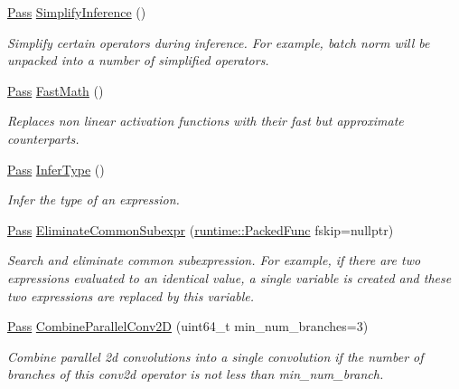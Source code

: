 \begin{DoxyCompactItemize}
\hyperlink{namespacetvm_1_1relay_1_1transform_afa666ade112e9955059095d695238a9a}{Pass} \hyperlink{namespacetvm_1_1relay_1_1transform_add13a2ad7b216ad4683141bbbb4f6943}{Simplify\+Inference} ()
\begin{DoxyCompactList}\small\item\em Simplify certain operators during inference. For example, batch norm will be unpacked into a number of simplified operators. \end{DoxyCompactList}\item 
\hyperlink{namespacetvm_1_1relay_1_1transform_afa666ade112e9955059095d695238a9a}{Pass} \hyperlink{namespacetvm_1_1relay_1_1transform_a22870dd16693b2e3edb5fba7cb5dc3e8}{Fast\+Math} ()
\begin{DoxyCompactList}\small\item\em Replaces non linear activation functions with their fast but approximate counterparts. \end{DoxyCompactList}\item 
\hyperlink{namespacetvm_1_1relay_1_1transform_afa666ade112e9955059095d695238a9a}{Pass} \hyperlink{namespacetvm_1_1relay_1_1transform_a1a4fe2161bf32a60bc2e57debab083ee}{Infer\+Type} ()
\begin{DoxyCompactList}\small\item\em Infer the type of an expression. \end{DoxyCompactList}\item 
\hyperlink{namespacetvm_1_1relay_1_1transform_afa666ade112e9955059095d695238a9a}{Pass} \hyperlink{namespacetvm_1_1relay_1_1transform_adf21ade01969835b155241d277a94d1c}{Eliminate\+Common\+Subexpr} (\hyperlink{classtvm_1_1runtime_1_1PackedFunc}{runtime\+::\+Packed\+Func} fskip=nullptr)
\begin{DoxyCompactList}\small\item\em Search and eliminate common subexpression. For example, if there are two expressions evaluated to an identical value, a single variable is created and these two expressions are replaced by this variable. \end{DoxyCompactList}\item 
\hyperlink{namespacetvm_1_1relay_1_1transform_afa666ade112e9955059095d695238a9a}{Pass} \hyperlink{namespacetvm_1_1relay_1_1transform_a3b8f4cbf0bd699d2ca0ab92c534c867d}{Combine\+Parallel\+Conv2D} (uint64\+\_\+t min\+\_\+num\+\_\+branches=3)
\begin{DoxyCompactList}\small\item\em Combine parallel 2d convolutions into a single convolution if the number of branches of this conv2d operator is not less than {\ttfamily min\+\_\+num\+\_\+branch}. \end{DoxyCompactList}\item 

\end{DoxyCompactItemize}
